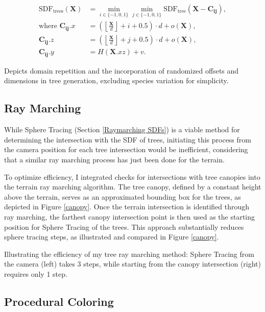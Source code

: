 \begin{equation}
\begin{aligned}
\text{SDF}_\text{trees}(\mathbf{X}) &= \min_{i\in\{-1,0,1\}}\min_{j\in\{-1,0,1\}}\text{SDF}_\text{tree}(\mathbf{X} - \mathbf{C_{ij}}), \\
\text{where } \mathbf{C_{ij}}.x & = \left(\left\lfloor \frac{\mathbf{X}}{d} \right\rfloor + i + 0.5\right) \cdot d + o(\mathbf{X}), \\
\mathbf{C_{ij}}.z & = \left(\left\lfloor \frac{\mathbf{X}}{d} \right\rfloor + j + 0.5\right) \cdot d + o(\mathbf{X}), \\
\mathbf{C_{ij}}.y &= H(\mathbf{X}.{xz}) + v.
\end{aligned}
\end{equation}

{Depicts domain repetition and the incorporation of randomized offsets and dimensions in tree generation, excluding species variation for simplicity.}

\subsection{Ray Marching}
\label{Tree Ray Marching}

While Sphere Tracing (Section \ref{Raymarching SDFs}) is a viable method for determining the intersection with the SDF of trees, initiating this process from the camera position for each tree intersection would be inefficient, considering that a similar ray marching process has just been done for the terrain.

To optimize efficiency, I integrated checks for intersections with tree canopies into the terrain ray marching algorithm. The tree canopy, defined by a constant height above the terrain, serves as an approximated bounding box for the trees, as depicted in Figure \ref{canopy}. Once the terrain intersection is identified through ray marching, the farthest canopy intersection point is then used as the starting position for Sphere Tracing of the trees. This approach substantially reduces sphere tracing steps, as illustrated and compared in Figure \ref{canopy}. 

{Illustrating the efficiency of my tree ray marching method: Sphere Tracing from the camera (left) takes 3 steps, while starting from the canopy intersection (right) requires only 1 step.}

\subsection{Procedural Coloring}

